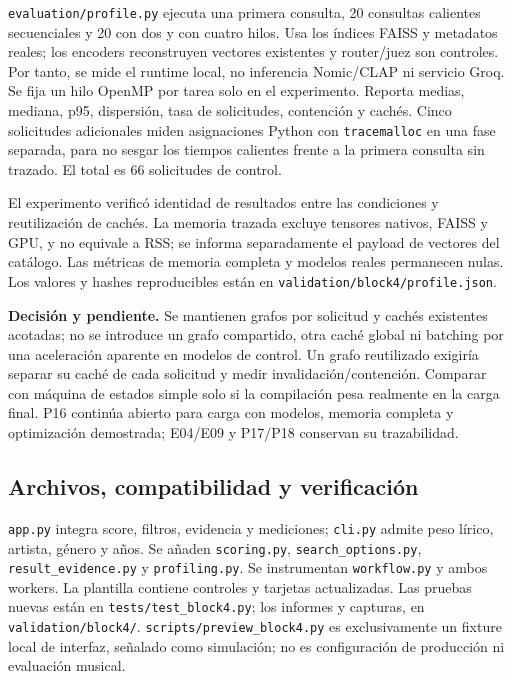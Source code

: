 \texttt{evaluation/profile.py} ejecuta una primera consulta, 20 consultas
calientes secuenciales y 20 con dos y con cuatro hilos. Usa los índices FAISS
y metadatos reales; los encoders reconstruyen vectores existentes y router/juez
son controles. Por tanto, se mide el runtime local, no inferencia Nomic/CLAP ni
servicio Groq. Se fija un hilo OpenMP por tarea solo en el experimento. Reporta
medias, mediana, p95, dispersión, tasa de solicitudes, contención y cachés.
Cinco solicitudes adicionales miden asignaciones Python con
\texttt{tracemalloc} en una fase separada, para no sesgar los tiempos calientes
frente a la primera consulta sin trazado. El total es 66 solicitudes de control.

El experimento verificó identidad de resultados entre las condiciones y
reutilización de cachés. La memoria trazada excluye tensores nativos, FAISS y
GPU, y no equivale a RSS; se informa separadamente el payload de vectores del
catálogo. Las métricas de memoria completa y modelos reales permanecen nulas.
Los valores y hashes reproducibles están en \texttt{validation/block4/profile.json}.

\textbf{Decisión y pendiente.} Se mantienen grafos por solicitud y cachés
existentes acotadas; no se introduce un grafo compartido, otra caché global ni
batching por una aceleración aparente en modelos de control. Un grafo reutilizado
exigiría separar su caché de cada solicitud y medir invalidación/contención.
Comparar con máquina de estados simple solo si la compilación pesa realmente en
la carga final. P16 continúa abierto para carga con modelos, memoria completa y
optimización demostrada; E04/E09 y P17/P18 conservan su trazabilidad.

\subsection{Archivos, compatibilidad y verificación}
\texttt{app.py} integra score, filtros, evidencia y mediciones; \texttt{cli.py}
admite peso lírico, artista, género y años. Se añaden
\texttt{scoring.py}, \texttt{search\_options.py}, \texttt{result\_evidence.py} y
\texttt{profiling.py}. Se instrumentan \texttt{workflow.py} y ambos workers.
La plantilla contiene controles y tarjetas actualizadas. Las pruebas nuevas
están en \texttt{tests/test\_block4.py}; los informes y capturas, en
\texttt{validation/block4/}. \texttt{scripts/preview\_block4.py} es exclusivamente
un fixture local de interfaz, señalado como simulación; no es configuración de
producción ni evaluación musical.

